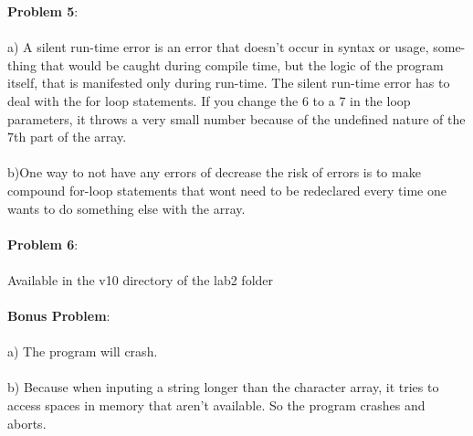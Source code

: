\documentclass[12pt]{article}
\newcommand{\tab}[0]{\indent \indent}
\newcommand{\enter}[0]{\\ \tab}
\newcommand{\nextline}[0]{\\ \enter}
\begin{document}
\textbf{Problem 5}: \nextline a) A silent run-time error is an error that doesn't occur in syntax or usage, some- \enter thing that would be caught during compile time, but the logic of the program itself, \tab that is manifested only during run-time. The silent run-time error has to deal with \tab the for loop statements. If you change the 6 to a 7 in the loop parameters, it throws \tab a very small number because of the undefined nature of the 7th part of the array.  \\\\   	 
\tab b)One way to not have any errors of decrease the risk of errors is to make \enter  compound for-loop statements that wont need to be redeclared every time one wants \tab to do something else with the array. \\\\
\textbf{Problem 6}: \nextline Available in the v10 directory of the lab2 folder \\\\	
\textbf{Bonus Problem}: \nextline a) The program will crash. \\ \enter b) Because when inputing a string longer than the character array, it tries to \enter access spaces in memory that aren't available. So the program crashes and aborts.
	
	
	
	
	
	
	
\end{document}
